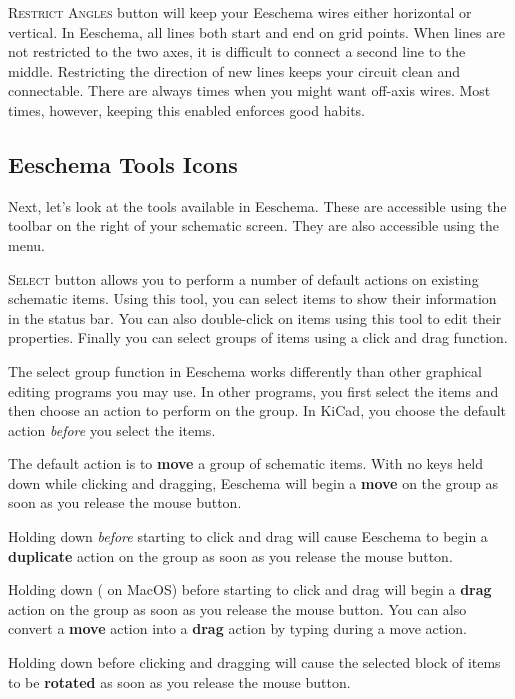 \textsc{Restrict Angles} button will keep your Eeschema wires either horizontal or vertical.
In Eeschema, all lines both start and end on grid points.
When lines are not restricted to the two axes, it is difficult to connect a second line to the middle.
Restricting the direction of new lines keeps your circuit clean and connectable.
There are always times when you might want off-axis wires.
Most times, however, keeping this enabled enforces good habits.

\subsection{Eeschema Tools Icons}
Next, let's look at the tools available in Eeschema.
These are accessible using the toolbar on the right of your schematic screen.
They are also accessible using the  menu.

\textsc{Select} button allows you to perform a number of default actions on existing schematic items.
Using this tool, you can select items to show their information in the status bar.
You can also double-click on items using this tool to edit their properties.
Finally you can select groups of items using a click and drag function.

The select group function in Eeschema works differently than other graphical editing programs you may use.
In other programs, you first select the items and then choose an action to perform on the group.
In KiCad, you choose the default action \textit{before} you select the items.

The default action is to \textbf{move} a group of schematic items.
With no keys held down while clicking and dragging, Eeschema will begin a \textbf{move} on the group as soon as you release the mouse button.

Holding down \keys{\shift} \textit{before} starting to click and drag will cause Eeschema to begin a \textbf{duplicate} action on the group as soon as you release the mouse button.

Holding down \keys{\ctrl} (\keys{\cmd} on MacOS) before starting to click and drag will begin a \textbf{drag}
action on the group as soon as you release the mouse button.
You can also convert a \textbf{move} action into a \textbf{drag} action by typing  during a move action.

Holding down \keys{\Alt}
before clicking and dragging will cause the selected block of items to be \textbf{rotated} as soon as you release the mouse button.

